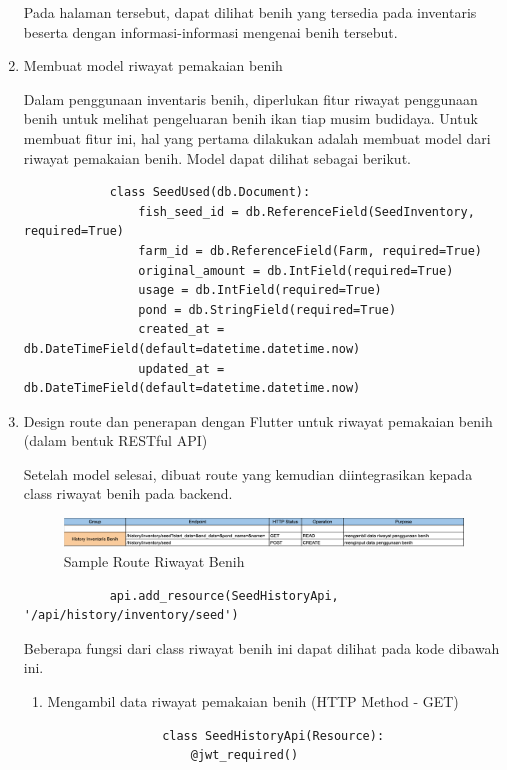 \begin{spacing}{1.5}
\begin{enumerate}
		Pada halaman tersebut, dapat dilihat benih yang tersedia pada inventaris beserta dengan informasi-informasi mengenai benih tersebut.

		\item Membuat model riwayat pemakaian benih
		
		Dalam penggunaan inventaris benih, diperlukan fitur riwayat penggunaan benih untuk melihat pengeluaran benih ikan tiap musim budidaya. Untuk membuat fitur ini, hal yang pertama dilakukan adalah membuat model dari riwayat pemakaian benih. Model dapat dilihat sebagai berikut.

		\begin{lstlisting}
			class SeedUsed(db.Document):
				fish_seed_id = db.ReferenceField(SeedInventory, required=True)
				farm_id = db.ReferenceField(Farm, required=True)
				original_amount = db.IntField(required=True)
				usage = db.IntField(required=True)
				pond = db.StringField(required=True)
				created_at = db.DateTimeField(default=datetime.datetime.now)
				updated_at = db.DateTimeField(default=datetime.datetime.now)
		\end{lstlisting}

		\item Design route dan penerapan dengan Flutter untuk riwayat pemakaian benih (dalam bentuk RESTful API)
		
		Setelah model selesai, dibuat route yang kemudian diintegrasikan kepada class riwayat benih pada backend.

		\begin{figure}[H]
			\centering
			\includegraphics[width=1\textwidth]{gambar/sprint3/history_benih_route.png}
			\caption{Sample Route Riwayat Benih}
		\end{figure}

		\begin{lstlisting}
			api.add_resource(SeedHistoryApi, '/api/history/inventory/seed')
		\end{lstlisting}

		Beberapa fungsi dari class riwayat benih ini dapat dilihat pada kode dibawah ini.

		\begin{enumerate}
			\item Mengambil data riwayat pemakaian benih (HTTP Method - GET) 
			
			\begin{lstlisting}
				class SeedHistoryApi(Resource):
					@jwt_required()


\end{lstlisting}
\end{enumerate}
\end{enumerate}
\end{spacing}
